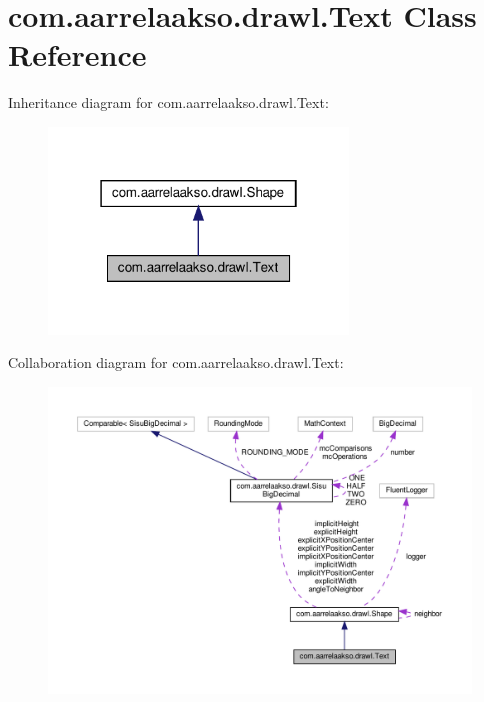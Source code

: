\hypertarget{classcom_1_1aarrelaakso_1_1drawl_1_1_text}{}\section{com.\+aarrelaakso.\+drawl.\+Text Class Reference}
\label{classcom_1_1aarrelaakso_1_1drawl_1_1_text}


Inheritance diagram for com.\+aarrelaakso.\+drawl.\+Text\+:\nopagebreak
\begin{figure}[H]
\begin{center}
\leavevmode
\includegraphics[width=226pt]{classcom_1_1aarrelaakso_1_1drawl_1_1_text__inherit__graph}
\end{center}
\end{figure}


Collaboration diagram for com.\+aarrelaakso.\+drawl.\+Text\+:\nopagebreak
\begin{figure}[H]
\begin{center}
\leavevmode
\includegraphics[width=350pt]{classcom_1_1aarrelaakso_1_1drawl_1_1_text__coll__graph}
\end{center}
\end{figure}

